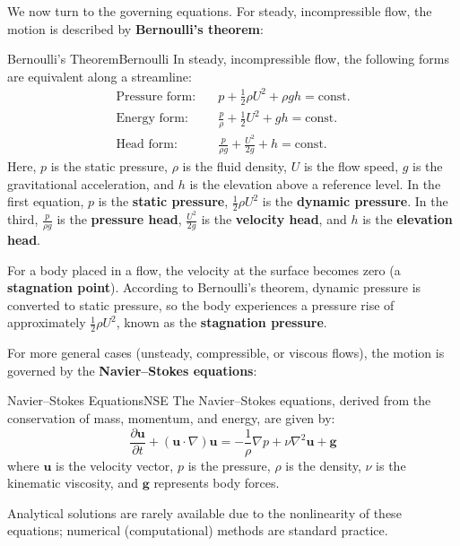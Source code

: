 \documentclass[uplatex,dvipdfmx,a4j,11pt]{report}
\newcommand{\keyword}[1]{\textcolor{mainblue}{\textbf{#1}}}
\numberwithin{equation}{chapter}
\begin{document}
\enskip

We now turn to the governing equations. For steady, incompressible flow, the motion is described by \keyword{Bernoulli's theorem}:
\begin{definition}{Bernoulli's Theorem}{Bernoulli}{}
  In steady, incompressible flow, the following forms are equivalent along a streamline:
  \begin{equation}
  \begin{aligned}
  \text{Pressure form}:      &\quad p + \frac{1}{2}\rho U^{2} + \rho g h = \mathrm{const.}\\
  \text{Energy form}:&\quad \frac{p}{\rho} + \frac{1}{2} U^{2} + g h = \mathrm{const.}\\
  \text{Head form}:      &\quad \frac{p}{\rho g} + \frac{U^{2}}{2g} + h = \mathrm{const.}
  \end{aligned}
  \end{equation}
  Here, $p$ is the static pressure, $\rho$ is the fluid density, $U$ is the flow speed, $g$ is the gravitational acceleration, and $h$ is the elevation above a reference level.
  In the first equation, $p$ is the \keyword{static pressure}, $\frac{1}{2}\rho U^{2}$ is the \keyword{dynamic pressure}. In the third, $\frac{p}{\rho g}$ is the \keyword{pressure head}, $\frac{U^{2}}{2g}$ is the \keyword{velocity head}, and $h$ is the \keyword{elevation head}.
\end{definition}

For a body placed in a flow, the velocity at the surface becomes zero (a \keyword{stagnation point}). According to Bernoulli's theorem, dynamic pressure is converted to static pressure, so the body experiences a pressure rise of approximately $\frac{1}{2}\rho U^{2}$, known as the \keyword{stagnation pressure}.

\enskip

For more general cases (unsteady, compressible, or viscous flows), the motion is governed by the \keyword{Navier--Stokes equations}:
\begin{definition}{Navier--Stokes Equations}{NSE}{}
  The Navier--Stokes equations, derived from the conservation of mass, momentum, and energy, are given by:
  \begin{equation}
  \frac{\partial \mathbf{u}}{\partial t} + (\mathbf{u} \cdot \nabla) \mathbf{u} = -\frac{1}{\rho} \nabla p + \nu \nabla^{2} \mathbf{u} + \mathbf{g}
  \end{equation}
  where $\mathbf{u}$ is the velocity vector, $p$ is the pressure, $\rho$ is the density, $\nu$ is the kinematic viscosity, and $\mathbf{g}$ represents body forces.
\end{definition}
Analytical solutions are rarely available due to the nonlinearity of these equations; numerical (computational) methods are standard practice.
\end{document}
